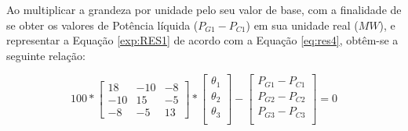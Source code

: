  	Ao multiplicar a grandeza por unidade pelo seu valor de base, com a finalidade de se obter os valores de Potência líquida ($P_{G1} - P_{C1}$) em sua unidade real ($MW$), e representar a Equação \ref{exp:RES1} de acordo com a Equação \ref{eq:res4}, obtêm-se a seguinte relação:
 	
 	\begin{equation}
		100*\begin{bmatrix}
       18 & -10 & -8 \\
       -10 & 15 & -5 \\
       -8 & -5 & 13\end{bmatrix} * 
       \begin{bmatrix}
       	\theta{_1} \\
       	\theta{_2} \\
       	\theta{_3} \\
       \end{bmatrix} - 
       \begin{bmatrix}
       	P_{G1} - P_{C1} \\
       	P_{G2} - P_{C2} \\
       	P_{G3} - P_{C3} \\
       \end{bmatrix} = 0
       \label{exp:RES2}
	\end{equation}
 	
 	
	
	
	
	
	